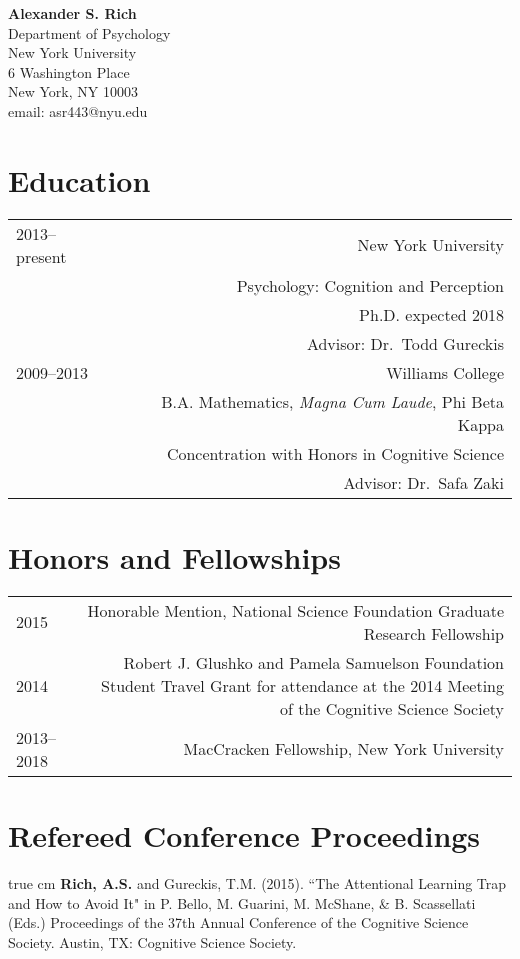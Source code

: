 \documentclass[12pt]{my_cv}
\def\ind{\hangindent=1 true cm\hangafter=1 \noindent}
\begin{document}
\noindent \textbf{\sffamily\Large Alexander S. Rich}\vspace{1em}\\
Department of Psychology\\
New York University\\
6 Washington Place\\
 New York, NY 10003\\
email: asr443@nyu.edu\\

\section{Education}
\begin{tabular}{L R}
2013--present&New York University\\
&Psychology: Cognition and Perception\\
&Ph.D. expected 2018\\
&Advisor: Dr.\ Todd Gureckis \vspace{1em}\\ 
2009--2013&Williams College\\
&B.A. Mathematics, \emph{Magna Cum Laude}, Phi Beta Kappa\\
&Concentration with Honors in Cognitive Science\\
&Advisor: Dr.\ Safa Zaki\\
\end{tabular}

\section{Honors and Fellowships}
\begin{tabular}{L R}
2015&Honorable Mention, National Science Foundation Graduate Research Fellowship\\[1ex]
2014&Robert J. Glushko and Pamela Samuelson Foundation Student Travel Grant for attendance at the 2014 Meeting of the Cognitive Science Society\\[1ex]
2013--2018&MacCracken Fellowship, New York University\\
\end{tabular}

\section{Refereed Conference Proceedings}

\ind \textbf{Rich, A.S.} and Gureckis, T.M. (2015). ``The Attentional Learning Trap and How to Avoid It" in P. Bello, M. Guarini, M. McShane, \& B. Scassellati (Eds.) Proceedings of the 37th Annual Conference of the Cognitive Science Society. Austin, TX: Cognitive Science Society.	
\end{document}
